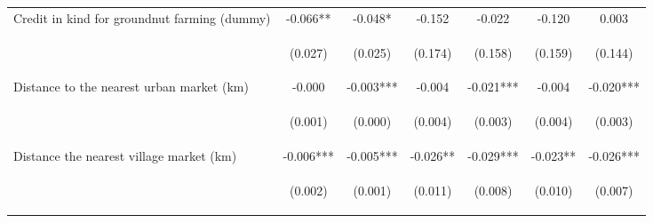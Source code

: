 \begin{center}
\begin{tabular}{lcccccc}
Credit in kind for groundnut farming (dummy) & -0.066** & -0.048* & -0.152 & -0.022 & -0.120 & 0.003 \\
\vspace{4pt} & \begin{footnotesize}(0.027)\end{footnotesize} & \begin{footnotesize}(0.025)\end{footnotesize} & \begin{footnotesize}(0.174)\end{footnotesize} & \begin{footnotesize}(0.158)\end{footnotesize} & \begin{footnotesize}(0.159)\end{footnotesize} & \begin{footnotesize}(0.144)\end{footnotesize} \\
Distance to the nearest urban market (km) & -0.000 & -0.003*** & -0.004 & -0.021*** & -0.004 & -0.020*** \\
\vspace{4pt} & \begin{footnotesize}(0.001)\end{footnotesize} & \begin{footnotesize}(0.000)\end{footnotesize} & \begin{footnotesize}(0.004)\end{footnotesize} & \begin{footnotesize}(0.003)\end{footnotesize} & \begin{footnotesize}(0.004)\end{footnotesize} & \begin{footnotesize}(0.003)\end{footnotesize} \\
Distance the nearest village market (km) & -0.006*** & -0.005*** & -0.026** & -0.029*** & -0.023** & -0.026*** \\
\vspace{4pt} & \begin{footnotesize}(0.002)\end{footnotesize} & \begin{footnotesize}(0.001)\end{footnotesize} & \begin{footnotesize}(0.011)\end{footnotesize} & \begin{footnotesize}(0.008)\end{footnotesize} & \begin{footnotesize}(0.010)\end{footnotesize} & \begin{footnotesize}(0.007)\end{footnotesize} \\

\end{tabular}
\end{center}
